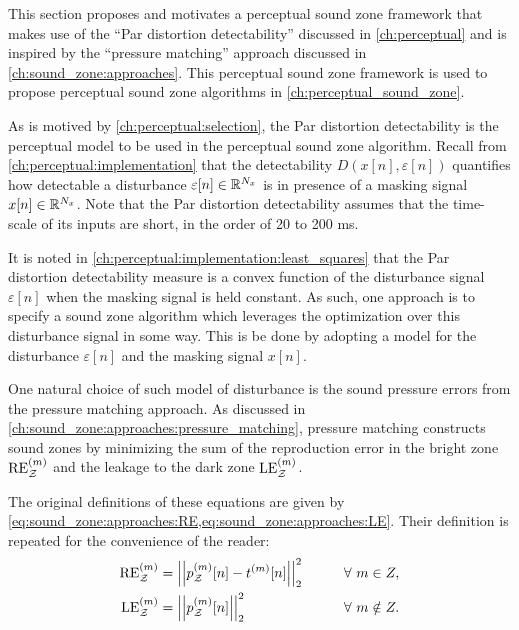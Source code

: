 This section proposes and motivates a perceptual sound zone framework that makes use of the 
``Par distortion detectability'' discussed in \autoref{ch:perceptual} 
and is inspired by the ``pressure matching'' approach discussed in \autoref{ch:sound_zone:approaches}.
This perceptual sound zone framework is used to propose perceptual sound zone algorithms in 
\autoref{ch:perceptual_sound_zone}.

As is motived by \autoref{ch:perceptual:selection}, the Par distortion detectability is the 
perceptual model to be used in the perceptual sound zone algorithm.
Recall from \autoref{ch:perceptual:implementation} that the detectability 
$D(x[n],\varepsilon[n])$ quantifies how detectable a disturbance $\varepsilon[n]\in\mathbb{R}^{N_x}$ 
is in presence of a masking signal $x[n]\in\mathbb{R}^{N_x}$.
Note that the Par distortion detectability assumes that the time-scale of its inputs are short, 
in the order of 20 to 200 ms.

It is noted in \autoref{ch:perceptual:implementation:least_squares} that the Par distortion detectability measure
is a convex function of the disturbance signal $\varepsilon[n]$ when the masking signal is held constant. 
As such, one approach is to specify a sound zone algorithm which leverages the optimization over 
this disturbance signal in some way.
This is be done by adopting a model for the disturbance $\varepsilon[n]$ and the masking signal $x[n]$.

One natural choice of such model of disturbance is the sound pressure errors from the pressure matching approach.
As discussed in \autoref{ch:sound_zone:approaches:pressure_matching}, pressure matching constructs 
sound zones by minimizing the sum of the reproduction error in the bright zone $\text{RE}^{(m)}_{\mathcal{Z}}$ 
 and the leakage to the dark zone $\text{LE}^{(m)}_{\mathcal{Z}}$.

The original definitions of these equations are given by \autoref{eq:sound_zone:approaches:RE,eq:sound_zone:approaches:LE}.
Their definition is repeated for the convenience of the reader: 
\begin{alignat}{2}
    \text{RE}^{(m)}_\zz &= \norm[2][2]{p_\zz^{(m)}[n] - t^{(m)}[n]} \qquad&& \forall\,\, m\in Z, \\
    \text{LE}^{(m)}_\zz &= \norm[2][2]{p_\zz^{(m)}[n]} \qquad&& \forall\,\, m\notin Z. 
\end{alignat}

